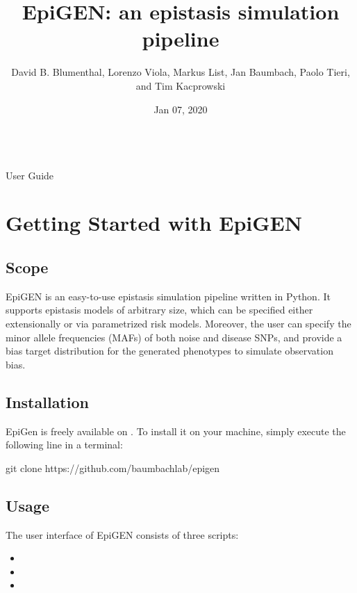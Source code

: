 \documentclass[a4paper,10pt,english]{sphinxhowto}
\title{EpiGEN: an epistasis simulation pipeline}
\date{Jan 07, 2020}
\author{David B. Blumenthal, Lorenzo Viola, Markus List, Jan Baumbach, Paolo Tieri, and Tim Kacprowski}
\begin{document}
\pagestyle{empty}
\makeatletter\py@HeaderFamily\raggedright{\huge\@title}\\[24pt]{\Large User Guide}\\[24pt]{\large\@author}\makeatother\normalfont
\pagestyle{plain}
\sphinxtableofcontents
\pagestyle{normal}
\label{\detokenize{index::doc}}



\section{Getting Started with EpiGEN}
\label{\detokenize{README:getting-started-with-epigen}}\label{\detokenize{README::doc}}

\subsection{Scope}
\label{\detokenize{README:scope}}
EpiGEN is an easy-to-use epistasis simulation pipeline written in Python. It supports epistasis models of arbitrary size, which can be specified either extensionally or via parametrized risk models. Moreover, the user can specify the minor allele frequencies (MAFs) of both noise and disease SNPs, and provide a bias target distribution for the generated phenotypes to simulate observation bias.


\subsection{Installation}
\label{\detokenize{README:installation}}
EpiGen is freely available on . To install it on your machine, simply execute the following line in a terminal:

\begin{sphinxVerbatim}[commandchars=\\\{\}]
git clone https://github.com/baumbachlab/epigen
\end{sphinxVerbatim}


\subsection{Usage}
\label{\detokenize{README:usage}}
The user interface of EpiGEN consists of three scripts:
\begin{itemize}
\item {} 

\item {} 

\item {} 

\end{itemize}
\end{document}
